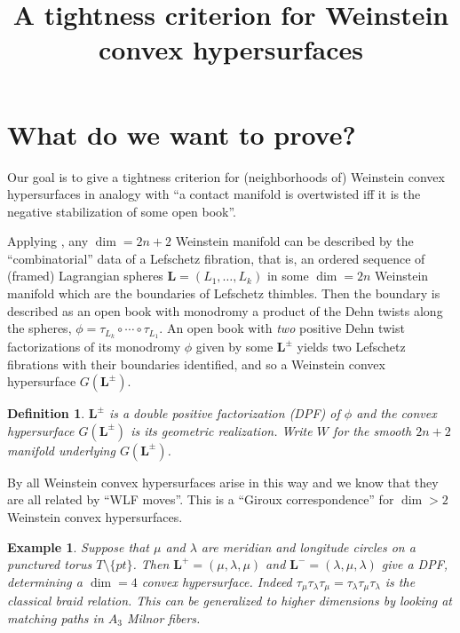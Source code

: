 \documentclass[11pt]{amsart}
\title[Weinstein convex hypersurfaces]{A tightness criterion for Weinstein convex hypersurfaces}
\newcommand{\thicc}[1]{\pmb{#1}}
\newcommand{\LagTuple}{\thicc{L}}
\newtheorem{ex}[thm]{Example}
\newtheorem{defn}[thm]{Definition}
\begin{document}
\maketitle

\section{What do we want to prove?}

Our goal is to give a tightness criterion for (neighborhoods of) Weinstein convex hypersurfaces \cite{HH:Convex} in analogy with ``a contact manifold is overtwisted iff it is the negative stabilization of some open book''.

Applying \cite{BHH:GirouxCorrespondence, GirouxPardon}, any $\dim = 2n+2$ Weinstein manifold can be described by the ``combinatorial'' data of a Lefschetz fibration, that is, an ordered sequence of (framed) Lagrangian spheres $\LagTuple = (L_{1}, \dots, L_{k})$ in some $\dim=2n$ Weinstein manifold which are the boundaries of Lefschetz thimbles. Then the boundary is described as an open book with monodromy a product of the Dehn twists along the spheres, $\phi = \tau_{L_{k}}\circ \cdots \circ \tau_{L_{1}}$. An open book with \emph{two} positive Dehn twist factorizations of its monodromy $\phi$ given by some $\LagTuple^{\pm}$ yields two Lefschetz fibrations with their boundaries identified, and so a Weinstein convex hypersurface $G(\LagTuple^{\pm})$. 

\begin{defn}
$\LagTuple^{\pm}$ is a \emph{double positive factorization} (DPF) of $\phi$ and the convex hypersurface $G(\LagTuple^{\pm})$ is its \emph{geometric realization}. Write $W$ for the smooth $2n+2$ manifold underlying $G(\LagTuple^{\pm})$.
\end{defn}

By \cite{BHH:GirouxCorrespondence} all Weinstein convex hypersurfaces arise in this way and we know that they are all related by ``WLF moves''. This is a ``Giroux correspondence'' for $\dim > 2$ Weinstein convex hypersurfaces.

\begin{ex}
Suppose that $\mu$ and $\lambda$ are meridian and longitude circles on a punctured torus $T \setminus \{ pt \}$. Then $\LagTuple^{+} = (\mu, \lambda, \mu)$ and $\LagTuple^{-} = (\lambda, \mu, \lambda)$ give a DPF, determining a $\dim=4$ convex hypersurface. Indeed $\tau_{\mu}\tau_{\lambda}\tau_{\mu} = \tau_{\lambda}\tau_{\mu}\tau_{\lambda}$ is the classical braid relation. This can be generalized to higher dimensions by looking at matching paths in $A_{3}$ Milnor fibers.
\end{ex}
\end{document}
